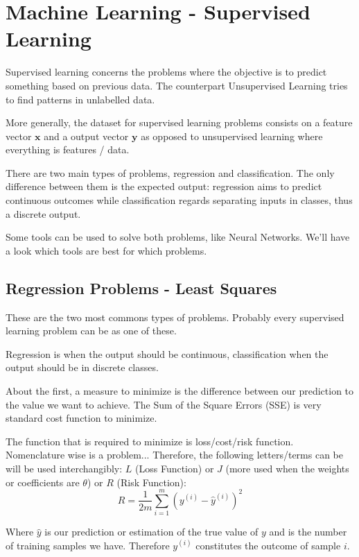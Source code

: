 
\section{Machine Learning - Supervised Learning}


Supervised learning concerns the problems where the objective is to predict something based on previous data. The counterpart Unsupervised Learning tries to find patterns in unlabelled data.

More generally, the dataset for supervised learning problems consists on a feature vector $\mathbf{x}$ and a output vector $\mathbf{y}$ as opposed to unsupervised learning where everything is features / data.


There are two main types of problems, regression and classification. The only difference between them is the expected output: regression aims to predict continuous outcomes while classification regards separating inputs in classes, thus a discrete output.

Some tools can be used to solve both problems, like Neural Networks. We'll have a look which tools are best for which problems.


\subsection{Regression Problems - Least Squares}
These are the two most commons types of problems. Probably every supervised learning problem can be  as one of these.

Regression is when the output should be continuous, classification when the output should be in discrete classes. 

About the first, a measure to minimize is the difference between our prediction to the value we want to achieve. The Sum of the Square Errors (SSE) is very standard cost function to minimize.

The function that is required to minimize is loss/cost/risk function. Nomenclature wise is a problem... Therefore, the following letters/terms can be will be used interchangibly: $L$ (Loss Function) or $J$ (more used when the weights or coefficients are $\theta$) or $R$ (Risk Function):
\begin{equation}
    R = \frac{1}{2m} \sum_{i = 1}^m \left(y^{(i)} - \hat{y}^{(i)}\right)^2
\end{equation}

Where $\hat{y}$ is our prediction or estimation of the true value of $y$ and  is the number of training samples we have. Therefore $y^(i)$ constitutes the outcome of sample $i$.


